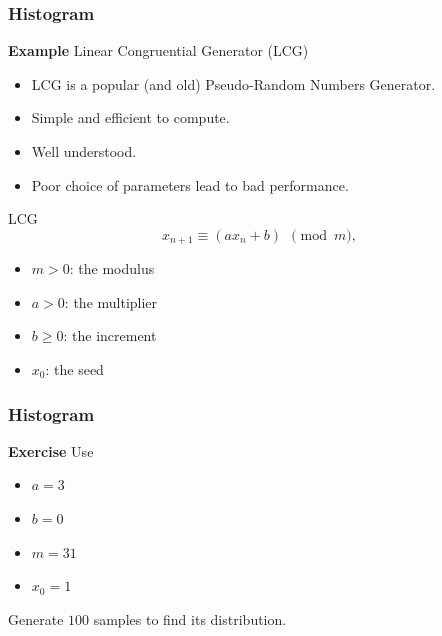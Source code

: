 \documentclass{beamer}  %
\begin{document}
\begin{frame}[fragile]
\frametitle{Histogram}
\textbf{Example} 
Linear Congruential Generator (LCG)

\begin{itemize}[<+->]
    \item LCG is a popular (and old) Pseudo-Random Numbers Generator.
    \item Simple and efficient to compute.
    \item Well understood.
    \item Poor choice of parameters lead to bad performance.
\end{itemize}
\pause
\begin{block}{LCG}
\begin{equation}
    x_{n+1} \equiv \left( a x_n + b \right)~~\pmod{m},
\end{equation}
\begin{itemize}
    \item $m > 0$: the modulus
    \item $a > 0$: the multiplier
    \item $b \geq 0$: the increment
    \item $x_0$: the seed
\end{itemize}
\end{block}

\end{frame}
\begin{frame}[fragile]
\frametitle{Histogram}
\textbf{Exercise} 
Use
\begin{itemize}
    \item $a = 3$
    \item $b = 0$
    \item $m = 31$
    \item $x_0 = 1$
\end{itemize}
Generate $100$ samples to find its distribution.
\setcounter{subfigure}{0}
\begin{figure}
    \centering
\end{figure}

\end{frame}
\end{document}
